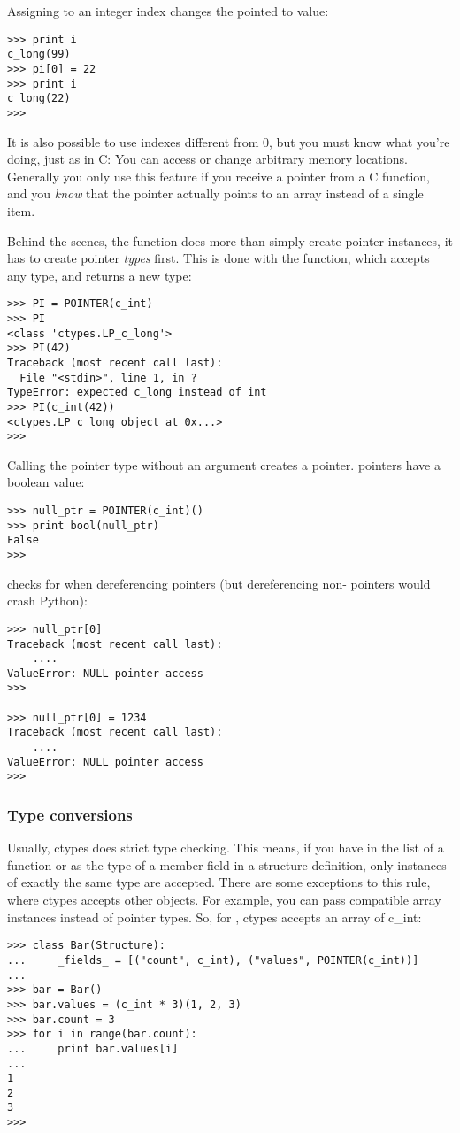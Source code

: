 Assigning to an integer index changes the pointed to value:
\begin{verbatim}
>>> print i
c_long(99)
>>> pi[0] = 22
>>> print i
c_long(22)
>>>
\end{verbatim}

It is also possible to use indexes different from 0, but you must know
what you're doing, just as in C: You can access or change arbitrary
memory locations. Generally you only use this feature if you receive a
pointer from a C function, and you \emph{know} that the pointer actually
points to an array instead of a single item.

Behind the scenes, the  function does more than simply
create pointer instances, it has to create pointer \emph{types} first.
This is done with the  function, which accepts any
 type, and returns a new type:
\begin{verbatim}
>>> PI = POINTER(c_int)
>>> PI
<class 'ctypes.LP_c_long'>
>>> PI(42)
Traceback (most recent call last):
  File "<stdin>", line 1, in ?
TypeError: expected c_long instead of int
>>> PI(c_int(42))
<ctypes.LP_c_long object at 0x...>
>>>
\end{verbatim}

Calling the pointer type without an argument creates a 
pointer.   pointers have a  boolean value:
\begin{verbatim}
>>> null_ptr = POINTER(c_int)()
>>> print bool(null_ptr)
False
>>>
\end{verbatim}

 checks for  when dereferencing pointers (but
dereferencing non- pointers would crash Python):
\begin{verbatim}
>>> null_ptr[0]
Traceback (most recent call last):
    ....
ValueError: NULL pointer access
>>>

>>> null_ptr[0] = 1234
Traceback (most recent call last):
    ....
ValueError: NULL pointer access
>>>
\end{verbatim}


\subsubsection{Type conversions\label{ctypes-type-conversions}}

Usually, ctypes does strict type checking.  This means, if you have
 in the  list of a function or as the
type of a member field in a structure definition, only instances of
exactly the same type are accepted.  There are some exceptions to this
rule, where ctypes accepts other objects.  For example, you can pass
compatible array instances instead of pointer types.  So, for
, ctypes accepts an array of c{\_}int:
\begin{verbatim}
>>> class Bar(Structure):
...     _fields_ = [("count", c_int), ("values", POINTER(c_int))]
...
>>> bar = Bar()
>>> bar.values = (c_int * 3)(1, 2, 3)
>>> bar.count = 3
>>> for i in range(bar.count):
...     print bar.values[i]
...
1
2
3
>>>
\end{verbatim}

